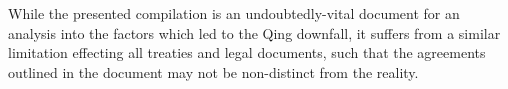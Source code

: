 \documentclass{article}
\begin{document}
While the presented compilation is an undoubtedly-vital document for an analysis into the factors which led to the Qing downfall, it suffers from a similar limitation effecting all treaties and legal documents, such that the agreements outlined in the document may not be non-distinct from the reality.

\pagebreak
\printbibliography[title={Cited Works}, heading=bibintoc]
\end{document}
